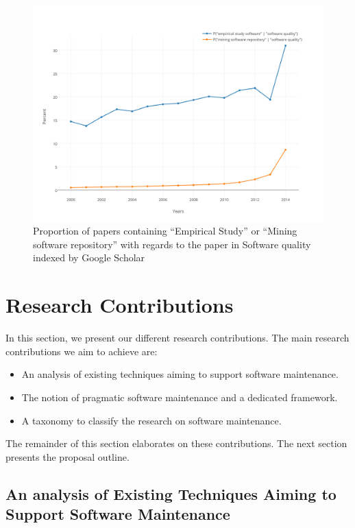 \begin{itemize}
	\begin{figure}[h!]
	  \centering
	  	    \includegraphics[scale=0.7]{media/scholar.png}
	    \caption{Proportion of papers containing ``Empirical Study'' or ``Mining software repository'' with regards to the paper in Software quality indexed by Google Scholar	\label{fig:scholar}}
	\end{figure}

\end{itemize}

\section{Research Contributions\label{sec:objective-thesis}}

In this section, we present our different research contributions.
The main research contributions we aim to achieve are:

\begin{itemize}
	\item An analysis of existing techniques aiming to support software maintenance.
	\item The notion of pragmatic software maintenance and a dedicated framework.
	\item A taxonomy to classify the research on software maintenance.
\end{itemize}

The remainder of this section elaborates on these contributions.
The next section presents the proposal outline.

\subsection{An analysis of Existing Techniques Aiming to Support Software Maintenance}

